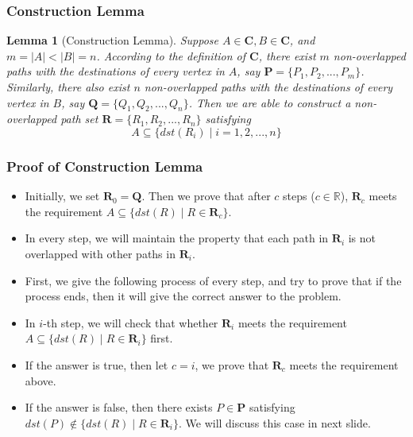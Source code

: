\documentclass[notheorems]{beamer}
\newtheorem{lemma}[theorem]{Lemma}
\begin{document}
\begin{frame}
\frametitle{Construction Lemma}
\begin{lemma}[Construction Lemma]
Suppose $A \in \mathbf{C}, B \in \mathbf{C}$, and $m = |A| < |B| = n$. According to the definition of $\mathbf{C}$, there exist $m$ non-overlapped paths with the destinations of every vertex in $A$, say $\mathbf{P} = \{P_1, P_2, ..., P_m\}$. Similarly, there also exist $n$ non-overlapped paths with the destinations of every vertex in $B$, say $\mathbf{Q} = \{Q_1, Q_2, ..., Q_n\}$. Then we are able to construct a non-overlapped path set $\mathbf{R} = \{R_1, R_2, ..., R_n\}$ satisfying
\begin{displaymath}
A \subseteq \{dst(R_i) \mid i = 1,2,...,n\}
\end{displaymath}
\end{lemma}
\end{frame}

\begin{frame}
\frametitle{Proof of Construction Lemma}
\begin{itemize}
\item Initially, we set $\mathbf{R}_0 = \mathbf{Q}$. Then we prove that after $c$ steps ($c \in \mathbb{R}$), $\mathbf{R}_c$ meets the requirement $A \subseteq \{dst(R) \mid R \in \mathbf{R}_c\}$.
\pause
\item In every step, we will maintain the {\color{blue}property} that each path in $\mathbf{R}_i$ is not overlapped with other paths in $\mathbf{R}_i$.
\pause
\item First, we give the following process of every step, and try to prove that if the process ends, then it will give the correct answer to the problem.
\item In $i$-th step, we will check that whether $\mathbf{R}_i$ meets the requirement $A \subseteq \{dst(R) \mid R \in \mathbf{R}_i\}$ first.
\item If the answer is true, then let $c = i$, we prove that $\mathbf{R}_c$ meets the requirement above.
\item If the answer is false, then there exists $P \in \mathbf{P}$ satisfying $dst(P) \notin \{dst(R) \mid R \in \mathbf{R}_i\}$. We will discuss this case in next slide.
\end{itemize}
\end{frame}
\end{document}
